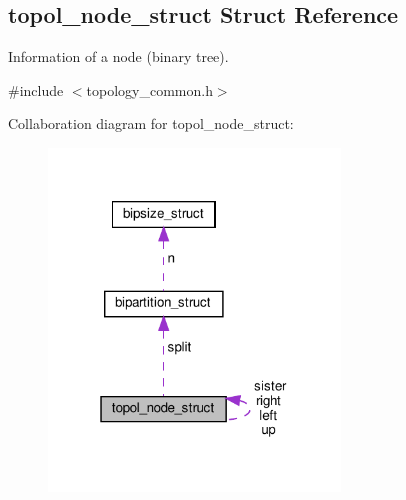 \hypertarget{structtopol__node__struct}{}\subsection{topol\+\_\+node\+\_\+struct Struct Reference}
\label{structtopol__node__struct}


Information of a node (binary tree).  




{\ttfamily \#include $<$topology\+\_\+common.\+h$>$}



Collaboration diagram for topol\+\_\+node\+\_\+struct\+:\nopagebreak
\begin{figure}[H]
\begin{center}
\leavevmode
\includegraphics[width=220pt]{structtopol__node__struct__coll__graph}
\end{center}
\end{figure}
